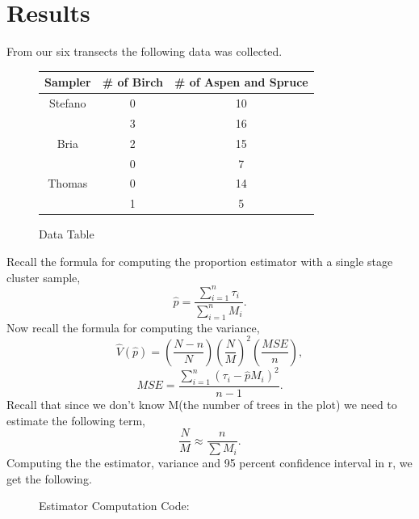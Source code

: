\documentclass[12pt]{amsart}
\begin{document}
\section{Results}
From our six transects the following data was collected. 
\begin{figure}
    \caption{Data Table}
\begin{center}
    \begin{tabular}{||c c c||} 
     \hline
     Sampler & \# of Birch & \# of Aspen and Spruce  \\ [0.5ex] 
     \hline\hline
     Stefano & 0 & 10 \\ 
     \hline
      & 3 & 16  \\
     \hline
     Bria & 2 & 15 \\
     \hline
      & 0 & 7  \\
     \hline
     Thomas & 0 & 14  \\ 
     \hline
      & 1 & 5  \\ [1ex] 
     \hline
    \end{tabular}
    \end{center}
\end{figure}
Recall the formula for computing the proportion estimator with a single stage cluster sample, 
\begin{equation*}
    \hat{p} = \dfrac{\sum_{i = 1}^{n} \tau_i }{\sum_{i = 1}^{n} M_i }.
\end{equation*}
Now recall the formula for computing the variance, 
\begin{equation*}
    \hat{V}(\hat{p}) = \left(\dfrac{N - n}{N}\right)\left(\dfrac{N}{M}\right)^2\left(\dfrac{MSE}{n}\right),
\end{equation*}
\begin{equation*}
    MSE = \dfrac{\sum_{i = 1}^{n}(\tau_i - \hat{p}M_i)^2}{n-1}.
\end{equation*}
Recall that since we don't know M(the number of trees in the plot) we need to estimate the following term, 
\begin{equation*}
    \dfrac{N}{M} \approx \frac{n}{\sum M_i}.
\end{equation*}
Computing the the estimator, variance and 95 percent confidence interval in r, we get the following. 
\begin{figure}[H]
    \begin{center}
        \caption{Estimator Computation Code:}
        
        \end{center} 
    \end{figure}
\end{document}
